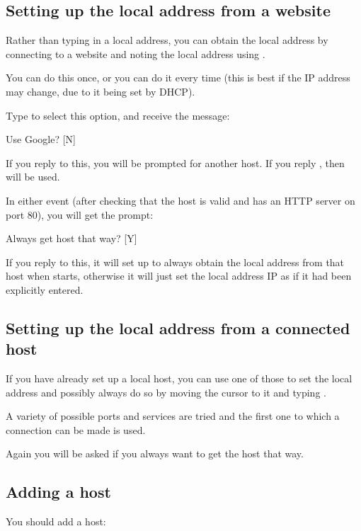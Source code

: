 \subsection{Setting up the local address from a website}
Rather than typing in a local address, you can obtain the local address by connecting to a website and noting the local address using
.

You can do this once, or you can do it every time (this is best if the IP address may change, due to it being set by DHCP).

Type  to select this option, and receive the message:

\begin{expara}

Use Google? [N]

\end{expara}

If you reply  to this, you will be prompted for another host. If you reply , then
 will be used.

In either event (after checking that the host is valid and has an HTTP server on port 80), you will get the prompt:

\begin{expara}

Always get host that way? [Y]

\end{expara}

If you reply  to this, it will set up to always obtain the local address from that host when \ProductName{} starts, otherwise
it will just set the local address IP as if it had been explicitly entered.

\subsection{Setting up the local address from a connected host}
If you have already set up a local host, you can use one of those to set
the local address and possibly always do so by moving the cursor to it
and typing .

A variety of possible ports and services are tried and the first one to
which a connection can be made is used.

Again you will be asked if you always want to get the host that way.

\subsection{Adding a host}
You should add a host:

